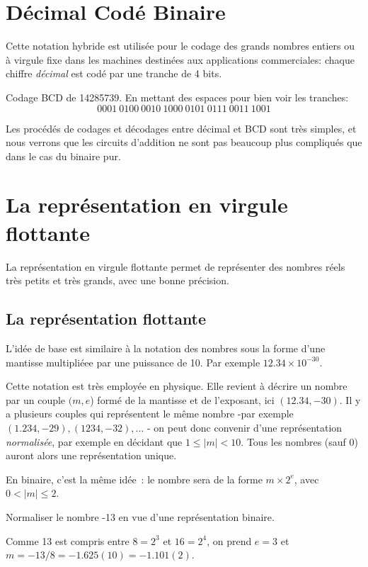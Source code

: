\section{D\'ecimal Cod\'e Binaire}

Cette notation hybride est utilis\'ee pour le codage des grands nombres
entiers ou \`a virgule fixe dans les machines destin\'ees aux applications
commerciales: chaque chiffre {\em d\'ecimal} est cod\'e par une tranche de 
4 bits.

\begin{exemple}{Codage BCD de 14285739.} En mettant des espaces pour bien voir 
les tranches: $$0001\ 0100\ 0010\ 1000\ 0101\ 0111\ 0011\ 1001$$
\end{exemple}

Les proc\'ed\'es de codages et d\'ecodages entre d\'ecimal et BCD sont tr\`es simples,
et nous verrons que les circuits d'addition ne sont pas beaucoup plus 
compliqu\'es que dans le cas du binaire pur.

\section{La repr\'esentation en virgule flottante}

La repr\'esentation en virgule flottante permet de repr\'esenter
des nombres r\'eels tr\`es petits et tr\`es grands, avec une bonne
pr\'ecision.

\subsection{La repr\'esentation flottante}

L'id\'ee de base est similaire \`a la notation des nombres
sous la forme d'une mantisse multipli\'eee par une puissance de 10. 
Par exemple $12.34 \times 10^{-30}$.

Cette notation est tr\`es employ\'ee en physique. Elle revient \`a d\'ecrire un
nombre par un couple $(m,e$) form\'e de la mantisse et de l'exposant, ici $(12.34, -30)$.
Il y a plusieurs couples qui repr\'esentent le m\^eme nombre -par exemple
$(1.234, -29), (1234, -32), \ldots$ - on peut donc
convenir d'une repr\'esentation {\em normalis\'ee}, par exemple en d\'ecidant
que $1 \leq | m | < 10 $. Tous les nombres (sauf 0) auront alors une 
repr\'esentation unique.

En binaire, c'est la m\^eme id\'ee~: le nombre sera de la forme 
$m \times 2^e$,
avec  $0 < | m | \leq 2$.  

\begin{exemple}{} Normaliser le nombre -13 en vue d'une repr\'esentation binaire.

Comme 13 est compris entre $8=2^3$ et $16=2^4$, on prend $e=3$ et
 $m=-13/8= -1.625 (10) = -1.101 (2) $.
\end{exemple}


